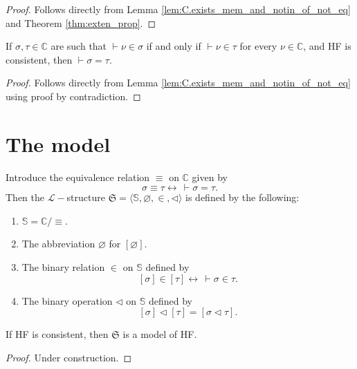 \begin{proof}
    \leanok
    Follows directly from Lemma \ref{lem:C.exists_mem_and_notin_of_not_eq} and 
    Theorem \ref{thm:exten_prop}.
\end{proof}

\begin{corollary}
    \label{cor:C.eq_of_forall_mem_iff_mem}
    \leanok
    If $\sigma, \tau \in \mathbb{C}$ are such that $\vdash \nu \in \sigma$ if and only if
    $\vdash \nu \in \tau$ for every $\nu \in \mathbb{C}$, and HF is consistent, 
    then $\vdash \sigma = \tau$.
\end{corollary}

\begin{proof}
    \leanok
    Follows directly from Lemma \ref{lem:C.exists_mem_and_notin_of_not_eq} 
    using proof by contradiction.
\end{proof}

\section{The model}

\begin{definition}
    \label{def:stdModel}
    \leanok
    Introduce the equivalence relation $\equiv$ on $\mathbb{C}$ given by
    $$
    \sigma \equiv \tau \leftrightarrow \,\vdash \sigma = \tau.
    $$
    Then the $\mathcal{L}-$structure 
    $\mathfrak{S} = \langle\mathbb{S}, \varnothing, \in, \lhd \rangle$ is defined by the following:
    \begin{enumerate}
        \item $\mathbb{S} = \mathbb{C}/{\equiv}$.
        \item The abbreviation $\varnothing$ for $[\varnothing]$.
        \item The binary relation $\in$ on $\mathbb{S}$ defined by
                $$[\sigma] \in [\tau] \leftrightarrow \,\vdash \sigma \in \tau.$$
        \item The binary operation $\lhd$ on $\mathbb{S}$ defined by
                $$[\sigma] \lhd [\tau] = [\sigma \lhd \tau].$$
    \end{enumerate}
\end{definition}

\begin{theorem}
    \label{stdModel.model_of_consistent}
    \leanok
    If HF is consistent, then $\mathfrak{S}$ is a model of HF.
\end{theorem}

\begin{proof}
    Under construction.
\end{proof}